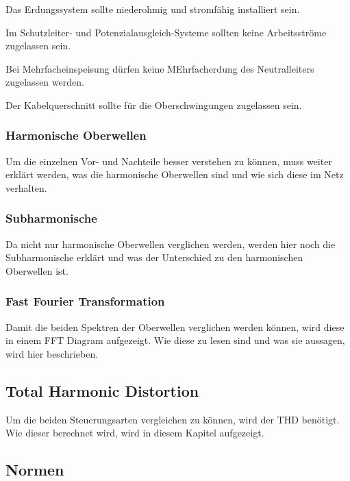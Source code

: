 Das Erdungssystem sollte niederohmig und stromfähig installiert sein.

Im Schutzleiter- und Potenzialausgleich-Systeme sollten keine Arbeitsströme zugelassen sein.

Bei Mehrfacheinspeisung dürfen keine MEhrfacherdung des Neutralleiters zugelassen werden.

Der Kabelquerschnitt sollte für die Oberschwingungen zugelassen sein.


  


\subsubsection{Harmonische Oberwellen}
Um die einzelnen Vor- und Nachteile besser verstehen zu können, muss weiter erklärt werden, was die harmonische Oberwellen sind und wie sich diese im Netz verhalten.
\subsubsection{Subharmonische}
Da nicht nur harmonische Oberwellen verglichen werden, werden hier noch die Subharmonische erklärt und was der Unterschied zu den harmonischen Oberwellen ist. 
\subsubsection{Fast Fourier Transformation}
Damit die beiden Spektren der Oberwellen verglichen werden können, wird diese in einem FFT Diagram aufgezeigt. Wie diese zu lesen sind und was sie aussagen, wird hier beschrieben. 

\subsection{Total Harmonic Distortion}
Um die beiden Steuerungsarten vergleichen zu können, wird der THD benötigt. Wie dieser berechnet wird, wird in diesem Kapitel aufgezeigt. 


\subsection{Normen}

